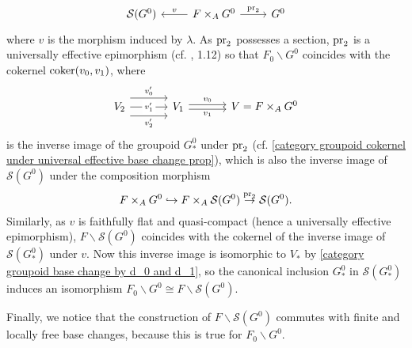 \[\begin{tikzcd}
\mathcal{S}(G^0)&F\times_AG^0\ar[l,swap,"v"]\ar[r,"\pr_2"]&G^0
\end{tikzcd}\]
where $v$ is the morphism induced by $\lambda$. As $\mathrm{pr}_2$ possesses a section, $\mathrm{pr}_2$ is a universally effective epimorphism (cf. \cite{SGA3-1} , 1.12) so that $F_0\backslash G^0$ coincides with the cokernel $\operatorname{coker}(v_0,v_1)$, where
\[\begin{tikzcd}[column sep=12mm]
V_2\ar[r,shift left=8pt,"v_0'"]\ar[r,shift right=8pt,swap,"v_2'"]\ar[r,"v_1'"description]&V_1\ar[r,shift left=2pt,"v_0"]\ar[r,shift right=2pt,swap,"v_1"]&V=F\times_AG^0
\end{tikzcd}\]
is the inverse image of the groupoid $G_*^0$ under $\mathrm{pr}_2$ (cf. \cref{category groupoid cokernel under universal effective base change prop}), which is also the inverse image of $\mathcal{S}(G^0)$ under the composition morphism
\[F\times_AG^0\hookrightarrow F\times_A\mathcal{S}(G^0)\stackrel{\mathrm{pr}_2}{\to}\mathcal{S}(G^0).\]
Similarly, as $v$ is faithfully flat and quasi-compact (hence a universally effective epimorphism), $F\backslash\mathcal{S}(G^0)$ coincides with the cokernel of the inverse image of $\mathcal{S}(G_*^0)$ under $v$. Now this inverse image is isomorphic to $V_*$ by \cref{category groupoid base change by d_0 and d_1}, so the canonical inclusion $G_*^0$ in $\mathcal{S}(G_*^0)$ induces an isomorphism $F_0\backslash G^0\cong F\backslash\mathcal{S}(G^0)$.\par
Finally, we notice that the construction of $F\backslash\mathcal{S}(G^0)$ commutes with finite and locally free base changes, because this is true for $F_0\backslash G^0$.\par

